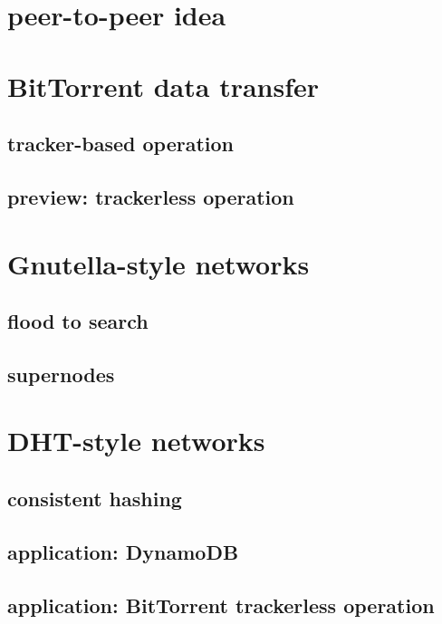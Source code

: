 \section{peer-to-peer idea}

\section{BitTorrent data transfer}

\subsection{tracker-based operation}

\subsection{preview: trackerless operation}

\section{Gnutella-style networks}

\subsection{flood to search}

\subsection{supernodes}

\section{DHT-style networks}

\subsection{consistent hashing}

\subsection{application: DynamoDB}

\subsection{application: BitTorrent trackerless operation}
